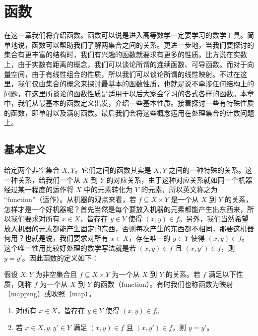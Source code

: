 
\chapter{函数}

在这一章我们将介绍函数。函数可以说是进入高等数学一定要学习的数学工具。简单地说，函数可以帮助我们了解两集合之间的关系。更进一步地，当我们要探讨的集合有更丰富的结构时，我们有兴趣的函数就要求有更多的性质。比方说在实数上，由于实数有距离的概念，我们可以谈论所谓的连续函数、可导函数。而对于向量空间，由于有线性组合的性质，所以我们可以谈论所谓的线性映射。不过在这里，我们仅由集合的概念来探讨最基本的函数性质，也就是说不牵涉任何结构上的问题，在这里所谈论的函数性质是适用于以后大家会学习的各式各样的函数。本章中，我们从最基本的函数定义出发，介绍一些基本性质。接着探讨一些有特殊性质的函数，即单射以及满射函数。最后我们会将这些概念运用在处理集合的计数问题上。

\section{基本定义}

给定两个非空集合 $X, Y$。它们之间的函数其实是 $X, Y$ 之间的一种特殊的关系。这一种关系，给我们一个从 $X$ 到 $Y$ 的对应关系，由于这种对应关系就如同一个机器经过某一程度的运作将 $X$ 中的元素转化为 $Y$ 的元素，所以英文称之为 “function”（运作）。从机器的观点来看，若 $f \subseteq X \times Y$ 是一个从 $X$ 到 $Y$ 的关系，怎样才是一个好机器呢？首先当然是每个要放入机器的元素都能产生出东西来，所以我们要求对所有 $x \in X$，皆存在 $y \in Y$ 使得 $(x, y) \in f$。另外，我们当然希望放入机器的元素都能产生固定的东西，否则每次产生的东西都不相同，那要这机器何用？也就是说，我们要求对所有 $x \in X$，存在唯一的 $y \in Y$ 使得 $(x, y) \in f$。这个唯一性用比较好处理的数学写法就是若 $(x, y) \in f$ 且 $(x, y') \in f$，则 $y = y'$。因此函数的定义如下：

\begin{definition}
假设 $X, Y$ 为非空集合且 $f \subseteq X \times Y$ 为一个从 $X$ 到 $Y$ 的关系。若 $f$ 满足以下性质，则称 $f$ 为一个从 $X$ 到 $Y$ 的函数（function）。有时我们也称函数为映射（mapping）或映照（map）。
\begin{enumerate}
    \item 对所有 $x \in X$，皆存在 $y \in Y$ 使得 $(x, y) \in f$。
    \item 若 $x \in X, y, y' \in Y$ 满足 $(x, y) \in f$ 且 $(x, y') \in f$，则 $y = y'$。
\end{enumerate}
\end{definition}

